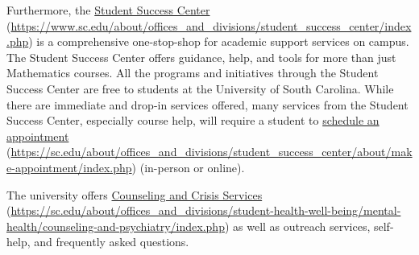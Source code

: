 \documentclass[11pt,letterpaper]{article}
\begin{document}
Furthermore, the \href{https://www.sc.edu/about/offices\_and\_divisions/student\_success\_center/index.php}{Student Success Center} (\url{https://www.sc.edu/about/offices\_and\_divisions/student\_success\_center/index.php}) is a comprehensive one-stop-shop for academic support services on campus. The Student Success Center offers guidance, help, and tools for more than just Mathematics courses. All the programs and initiatives through the Student Success Center are free to students at the University of South Carolina. While there are immediate and drop-in services offered, many services from the Student Success Center, especially course help, will require a student to \href{https://sc.edu/about/offices\_and\_divisions/student\_success\_center/about/make-appointment/index.php}{schedule an appointment} (\url{https://sc.edu/about/offices\_and\_divisions/student\_success\_center/about/make-appointment/index.php}) (in-person or online). 
\sectionbreak




The university offers \href{https://sc.edu/about/offices\_and\_divisions/student-health-well-being/mental-health/counseling-and-psychiatry/index.php}{Counseling and Crisis Services} (\url{https://sc.edu/about/offices\_and\_divisions/student-health-well-being/mental-health/counseling-and-psychiatry/index.php}) as well as outreach services, self-help, and frequently asked questions. \pspace
\end{document}
